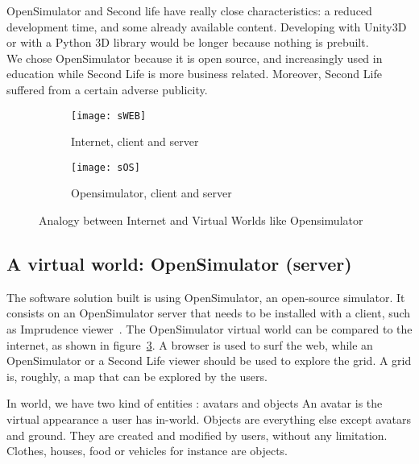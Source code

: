 OpenSimulator and Second life have really close characteristics: a reduced development time, and some already available content. Developing with Unity3D or with a Python 3D library would be longer because nothing is prebuilt.\\

    We chose OpenSimulator because it is open source, and increasingly used in education while Second Life is more business related. Moreover, Second Life suffered from a certain adverse publicity.

\begin{figure}[h]
        \begin{subfigure}[b]{0.4\textwidth}
                \centering
                \texttt{[image: sWEB]}
                \caption{Internet, client and server}
                \label{fig:sWEB}
        \end{subfigure}
        \begin{subfigure}[b]{0.4\textwidth}
                \centering
                \texttt{[image: sOS]}
                \caption{Opensimulator, client and server}
                \label{fig:sOS}
        \end{subfigure}
        
        \caption{Analogy between Internet and Virtual Worlds like Opensimulator}
        \label{fig:analogy}
\end{figure}

\subsection{A virtual world: OpenSimulator (server)}
The software solution built is using OpenSimulator, an open-source simulator. It consists on an OpenSimulator server that needs to be installed with a client, such as Imprudence viewer~\cite{imprudenceWebsite}.
The OpenSimulator virtual world can be compared to the internet, as shown in figure~\ref{fig:analogy}. A browser is used to surf the web, while an OpenSimulator or a Second Life viewer should be used to explore the grid. A grid is, roughly, a map that can be explored by the users. 

In world, we have two kind of entities : avatars and objects %
An avatar is the virtual appearance a user has in-world. %
Objects are everything else except avatars and ground. They are created and modified by users, without any limitation. Clothes, houses, food or vehicles for instance are objects.

